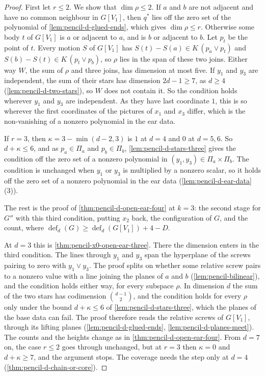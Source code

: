 \begin{proof}
  First let $r \le 2$. We show that $\dim \rho \le 2$. If $a$ and $b$
  are not adjacent and have no common neighbour in $G[V_1]$, then $q^*$
  lies off the zero set of the polynomial of
  \cref{lem:pencil-d-glued-ends}, which gives $\dim \rho \le r$.
  Otherwise some body $t$ of $G[V_1]$ is $a$ or adjacent to $a$, and is
  $b$ or adjacent to $b$. Let $p_t$ be the point of $t$. Every motion
  $S$ of $G[V_1]$ has $S(t) - S(a) \in K\,(p_a \vee p_t)$ and
  $S(b) - S(t) \in K\,(p_t \vee p_b)$, so $\rho$ lies in the span of
  these two joins. Either way $W$, the sum of $\rho$ and three joins, has
  dimension at most five. If $y_1$ and $y_3$ are independent, the sum of
  their stars has dimension $2d - 1 \ge 7$, as $d \ge 4$
  (\cref{lem:pencil-d-two-stars}), so $W$ does not contain it. So the
  condition holds wherever $y_1$ and $y_3$ are independent. As they have
  last coordinate $1$, this is so wherever the first coordinates of the
  pictures of $x_1$ and $x_3$ differ, which is the non-vanishing of a
  nonzero polynomial in the ear data.

  If $r = 3$, then $\kappa = 3 - \min(d - 2, 3)$ is $1$ at $d = 4$ and
  $0$ at $d = 5, 6$. So $d + \kappa \le 6$, and as $p_a \in \Pi_a$ and
  $p_b \in \Pi_b$, \cref{lem:pencil-d-stars-three} gives the condition off
  the zero set of a nonzero polynomial in
  $(y_1, y_3) \in \Pi_a \times \Pi_b$. The
  condition is unchanged when $y_1$ or $y_3$ is multiplied by a nonzero
  scalar, so it holds off the zero set of a nonzero polynomial in the ear
  data (\cref{lem:pencil-d-ear-data} (3)).

  The rest is the proof of \cref{thm:pencil-d-open-ear-four} at $k = 3$:
  the second stage for $G''$ with this third condition, putting $x_2$
  back, the configuration of $G$, and the count, where
  $\operatorname{def}_d(G) \ge \operatorname{def}_d(G[V_1]) + 4 - D$.

  At $d = 3$ this is \cref{thm:pencil-x0-open-ear-three}. There the
  dimension enters in the third condition. The lines through $y_1$ and
  $y_3$ span the hyperplane of the screws pairing to zero with
  $y_1 \vee y_3$. The proof splits on whether some relative screw pairs to
  a nonzero value with a line joining the planes of $a$ and $b$
  (\cref{lem:pencil-bilinear}), and the condition holds either way, for
  every subspace $\rho$. In dimension $d$ the sum of the two stars has
  codimension $\binom{d-1}{2}$, and the condition holds for every $\rho$
  only under the bound $d + \kappa \le 6$ of
  \cref{lem:pencil-d-stars-three}, which the planes of the base data can
  fail. The proof therefore reads the relative screws of $G[V_1]$,
  through its lifting planes (\cref{lem:pencil-d-glued-ends},
  \cref{lem:pencil-d-planes-meet}). The counts and the heights change as
  in \cref{thm:pencil-d-open-ear-four}. From $d = 7$ on, the case
  $r \le 2$ goes through unchanged, but at $r = 3$ then $\kappa = 0$ and
  $d + \kappa \ge 7$, and the argument stops.
  The coverage needs the step only at $d = 4$
  (\cref{thm:pencil-d-chain-or-core}).
\end{proof}

